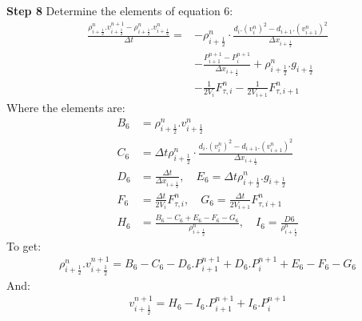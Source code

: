 \documentclass[11pt,letterpaper,titlepage]{article}
\newcommand{\half}{\frac{1}{2}}
\begin{document}
\newpage \noindent
\textbf{Step 8}\newline
Determine the elements of equation 6:
\begin{equation*}
\begin{aligned}
\frac{\rho_{i+\half}^{n}.v_{i+\half}^{n+1}-\rho_{i+\half}^n.v_{i+\half}^n}{\Delta t} =&- \rho_{i+\half}^n\cdot\frac{d_i.(v_{i}^n)^2-d_{i+1}.(v_{i+1}^n)^2}{\Delta x_{i+\half}}     \\
&-\frac{P_{i+1}^{n+1}-P_i^{n+1}}{\Delta x_{i+\half}} +\rho_{i+\half}^n.g_{i+\half} \\
&-\frac{1}{2V_i}F_{\tau,i}^n- \frac{1}{2V_{i+1}}F_{\tau,i+1}^n
\end{aligned}
\end{equation*}
\newline
Where the elements are:
\begin{equation*}
\begin{aligned}
B_6&=\rho_{i+\half}^n.v_{i+\half}^n\\
C_6&=\Delta t\rho_{i+\half}^n\cdot\frac{d_i.(v_{i}^n)^2-d_{i+1}.(v_{i+1}^n)^2}{\Delta x_{i+\half}}\\
D_6&=\frac{\Delta t}{\Delta x_{i+\half}}, \quad E_6=\Delta t \rho_{i+\half}^n.g_{i+\half} \\
F_6&=\frac{\Delta t}{2V_i}F_{\tau,i}^n, \quad G_6=\frac{\Delta t}{2V_{i+1}}F_{\tau,i+1}^n \\
H_6&=\frac{B_6-C_6+E_6-F_6-G_6}{\rho_{i+\half}^{n}}, \quad I_6=\frac{D6}{\rho_{i+\half}^{n}}
\end{aligned}
\end{equation*}
\newline
To get:
\begin{equation*}
\begin{aligned}
\rho_{i+\half}^{n}.v_{i+\half}^{n+1}=B_6-C_6-D_6.P_{i+1}^{n+1}+D_6.P_{i}^{n+1}+E_6-F_6-G_6
\end{aligned}
\end{equation*}
And:
\begin{equation}
\begin{aligned}
v_{i+\half}^{n+1}=H_6-I_6.P_{i+1}^{n+1}+I_6.P_{i}^{n+1}
\end{aligned}
\end{equation}
\end{document}
